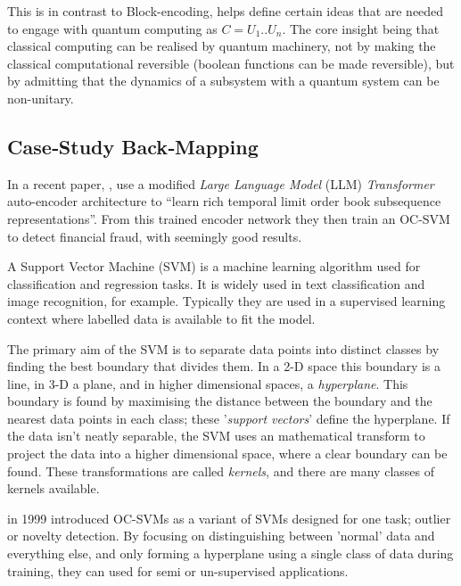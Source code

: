 This is in contrast to Block-encoding, 
helps define certain ideas that are needed to engage with quantum computing as $C = U_1 .. U_n$. 
The core insight being that classical computing can be realised by quantum machinery, 
not by making the classical computational reversible (boolean functions can be made reversible\cite{Bennett:1989}),
but by admitting that the dynamics of a subsystem with a quantum system can be non-unitary.

\subsection{Case‑Study Back‑Mapping}

In a recent paper, , \citeauthor{Poutre:2024} \cite{Poutre:2024} use a modified 
\emph{Large Language Model} (LLM) \emph{Transformer} auto-encoder architecture to 
\enquote{learn rich temporal limit order book subsequence representations}.  
From this trained encoder network they then train an OC-SVM to detect financial fraud, with seemingly good results.

A Support Vector Machine (SVM) is a machine learning algorithm used for classification and regression tasks.  
It is widely used in text classification and image recognition, for example.
Typically they are used in a supervised learning context where labelled data is available to fit the model.

The primary aim of the SVM is to separate data points into distinct classes by finding the best boundary that divides them.
In a 2-D space this boundary is a line, in 3-D a plane, and in higher dimensional spaces, a \emph{hyperplane}.
This boundary is found by maximising the distance between the boundary and the nearest data points in each class;
these '\emph{support vectors}' define the hyperplane. 
If the data isn't neatly separable, 
the SVM uses an mathematical transform to project the data into a higher dimensional space, 
where a clear boundary can be found.
These transformations are called \emph{kernels}, and there are many classes of kernels available.

\citeauthor{Scholkopf:1999} in 1999 \cite{Scholkopf:1999} introduced OC-SVMs as a variant of SVMs designed for one task;
outlier or novelty detection.
By focusing on distinguishing between 'normal' data and everything else, 
and only forming a hyperplane using a single class of data during training, 
they can used for semi or un-supervised applications.


